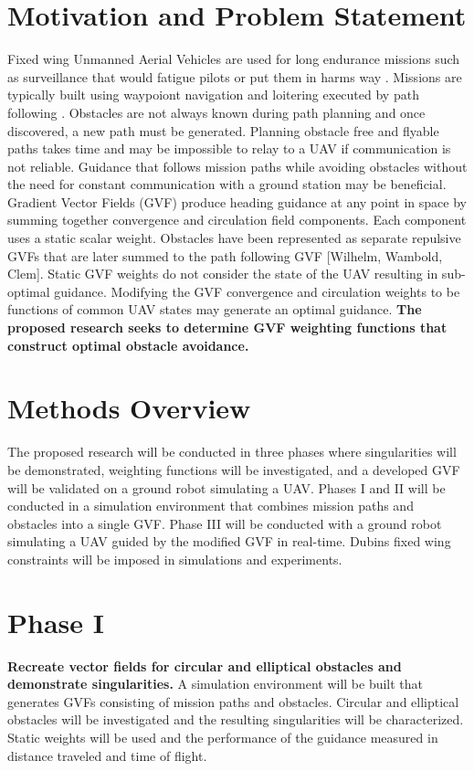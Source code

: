 \documentclass[numbered,pdftex]{ohio-etd}
\begin{document}
\section{Motivation and Problem Statement}
 Fixed wing Unmanned Aerial Vehicles are used for long endurance missions such as surveillance that would fatigue pilots or put them in harms way \cite{bone_uavs_2003}. Missions are typically built using waypoiont navigation and loitering executed by path following \cite{sujit_unmanned_2014}. Obstacles are not always known during path planning and once discovered, a new path must be generated. Planning obstacle free and flyable paths takes time and may be impossible to relay to a UAV if communication is not reliable. Guidance that follows mission paths while avoiding obstacles without the need for constant communication with a ground station  may be beneficial. Gradient Vector Fields (GVF) produce heading guidance at any point in space by summing together convergence and circulation field components. Each component uses a static scalar weight. Obstacles have been represented as separate repulsive GVFs that are later summed to the path following GVF [Wilhelm, Wambold, Clem]. Static GVF weights do not consider the state of the UAV resulting in sub-optimal guidance. Modifying the GVF convergence and circulation weights to be functions of common UAV states may generate an optimal guidance. \textbf{The proposed research seeks to determine GVF weighting functions that construct optimal obstacle avoidance.}
 \pagebreak
 
 
 
\section{Methods Overview}
The proposed research will be conducted in three phases where singularities will be demonstrated, weighting functions will be investigated, and a developed GVF will be validated on a ground robot simulating a UAV.  Phases I and II will be conducted in a simulation environment that combines mission paths and obstacles into a single GVF. Phase III will be conducted with a ground robot simulating a UAV guided by the modified GVF in real-time. Dubins fixed wing constraints will be imposed in simulations and experiments. 


\section{Phase I}
\textbf{Recreate vector fields for circular and elliptical obstacles and demonstrate singularities.} A simulation environment will be built that generates GVFs consisting of mission paths and obstacles. Circular and elliptical obstacles will be investigated and the resulting singularities will be characterized. Static weights will be used and the performance of the guidance measured in distance traveled and time of flight. 
\end{document}
